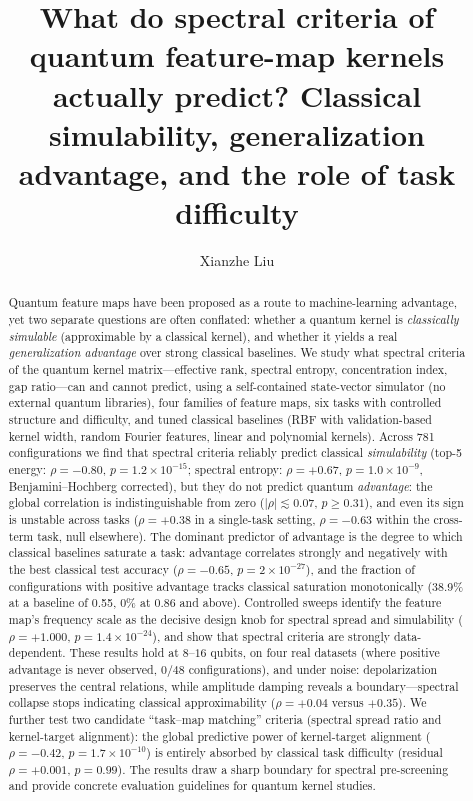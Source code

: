 \documentclass[aps,pra,preprint]{revtex4-2}
\title{What do spectral criteria of quantum feature-map kernels actually predict?
Classical simulability, generalization advantage, and the role of task difficulty}
\author{Xianzhe Liu}
\affiliation{School of Physics and Electronics, Hunan University, Changsha 410082, China}
\begin{document}
\maketitle

\begin{abstract}
Quantum feature maps have been proposed as a route to machine-learning advantage, yet
two separate questions are often conflated: whether a quantum kernel is \emph{classically
simulable} (approximable by a classical kernel), and whether it yields a real
\emph{generalization advantage} over strong classical baselines. We study what spectral
criteria of the quantum kernel matrix---effective rank, spectral entropy, concentration
index, gap ratio---can and cannot predict, using a self-contained state-vector simulator
(no external quantum libraries), four families of feature maps, six tasks with controlled
structure and difficulty, and tuned classical baselines (RBF with validation-based kernel
width, random Fourier features, linear and polynomial kernels). Across 781 configurations
we find that spectral criteria reliably predict classical \emph{simulability} (top-5
energy: $\rho=-0.80$, $p=1.2\times10^{-15}$; spectral entropy: $\rho=+0.67$,
$p=1.0\times10^{-9}$, Benjamini--Hochberg corrected), but they do not predict quantum
\emph{advantage}: the global correlation is indistinguishable from zero
($|\rho|\lesssim0.07$, $p\ge0.31$), and even its sign is unstable across tasks
($\rho=+0.38$ in a single-task setting, $\rho=-0.63$ within the cross-term task,
null elsewhere). The dominant predictor of advantage is the degree to which classical
baselines saturate a task: advantage correlates strongly and negatively with the best
classical test accuracy ($\rho=-0.65$, $p=2\times10^{-27}$), and the fraction of
configurations with positive advantage tracks classical saturation monotonically
(38.9\% at a baseline of 0.55, 0\% at 0.86 and above). Controlled sweeps identify the
feature map's frequency scale as the decisive design knob for spectral spread and
simulability ($\rho=+1.000$, $p=1.4\times10^{-24}$), and show that spectral criteria are
strongly data-dependent. These results hold at $8$--$16$ qubits, on four real datasets
(where positive advantage is never observed, $0/48$ configurations), and under noise:
depolarization preserves the central relations, while amplitude damping reveals a
boundary---spectral collapse stops indicating classical approximability
($\rho=+0.04$ versus $+0.35$). We further test two candidate ``task--map matching'' criteria
(spectral spread ratio and kernel-target alignment): the global predictive power of
kernel-target alignment ($\rho=-0.42$, $p=1.7\times10^{-10}$) is entirely absorbed by
classical task difficulty (residual $\rho=+0.001$, $p=0.99$). The results draw a sharp
boundary for spectral pre-screening and provide concrete evaluation guidelines for
quantum kernel studies.
\end{abstract}
\end{document}
